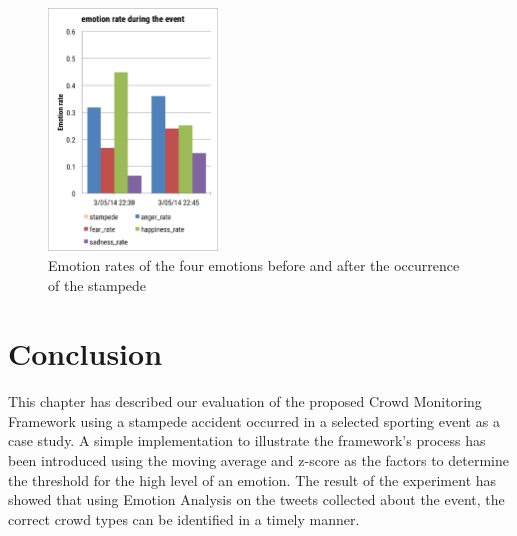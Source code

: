 \begin{figure}[!htbp]
\centering
\includegraphics[width=0.4\textwidth]{EmotionRatePrediction}
\caption{Emotion rates of the four emotions before and after the occurrence of the stampede}
\label{fig:emotionRatePrediction}
\end{figure}

\section{Conclusion}
This chapter has described our evaluation of the proposed Crowd Monitoring Framework using a stampede accident occurred in a selected sporting event as a case study. A simple implementation to illustrate the framework's process has been introduced using the moving average and z-score as the factors to determine the threshold for the high level of an emotion. The result of the experiment has showed that using Emotion Analysis on the tweets collected about the event, the correct crowd types can be identified in a timely manner.